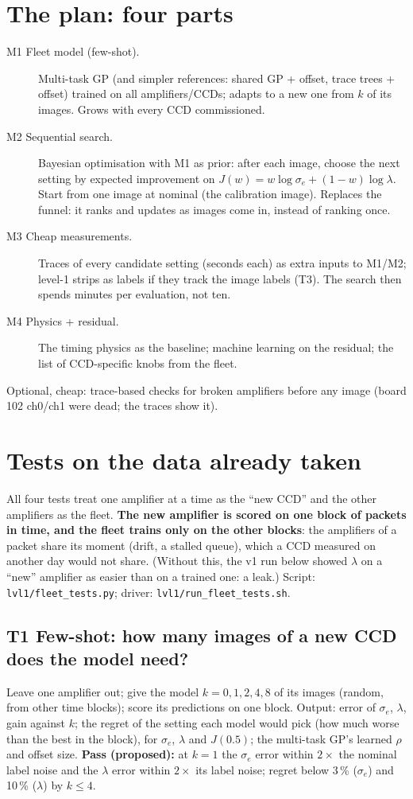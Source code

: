 \documentclass[11pt]{article}
\newcommand{\se}{\sigma_e}
\begin{document}
\section{The plan: four parts}
\begin{description}
\item[M1 Fleet model (few-shot).] Multi-task GP (and simpler references: shared GP + offset, trace trees + offset) trained
  on all amplifiers/CCDs; adapts to a new one from $k$ of its images. Grows with every CCD commissioned.
\item[M2 Sequential search.] Bayesian optimisation with M1 as prior: after each image, choose the next setting by
  expected improvement on $J(w) = w \log\se + (1-w)\log\lambda$. Start from one image at nominal (the calibration image).
  Replaces the funnel: it ranks and updates as images come in, instead of ranking once.
\item[M3 Cheap measurements.] Traces of every candidate setting (seconds each) as extra inputs to M1/M2; level-1 strips
  as labels if they track the image labels (T3). The search then spends minutes per evaluation, not ten.
\item[M4 Physics + residual.] The timing physics as the baseline; machine learning on the residual; the list of
  CCD-specific knobs from the fleet.
\end{description}
Optional, cheap: trace-based checks for broken amplifiers before any image (board 102 ch0/ch1 were dead; the traces
show it).

\section{Tests on the data already taken}\label{sec:tests}
All four tests treat one amplifier at a time as the ``new CCD'' and the other amplifiers as the fleet. \textbf{The new
amplifier is scored on one block of packets in time, and the fleet trains only on the other blocks}: the amplifiers of a
packet share its moment (drift, a stalled queue), which a CCD measured on another day would not share. (Without this,
the v1 run below showed $\lambda$ on a ``new'' amplifier as easier than on a trained one: a leak.) Script:
\texttt{lvl1/fleet\_tests.py}; driver: \texttt{lvl1/run\_fleet\_tests.sh}.

\subsection*{T1 Few-shot: how many images of a new CCD does the model need?}
Leave one amplifier out; give the model $k = 0, 1, 2, 4, 8$ of its images (random, from other time blocks); score its
predictions on one block. Output: error of $\se$, $\lambda$, gain against $k$; the regret of the setting each model would
pick (how much worse than the best in the block), for $\se$, $\lambda$ and $J(0.5)$; the multi-task GP's learned
$\rho$ and offset size. \textbf{Pass (proposed):} at $k = 1$ the $\se$ error within $2\times$ the nominal label noise and
the $\lambda$ error within $2\times$ its label noise; regret below 3\,\% ($\se$) and 10\,\% ($\lambda$) by $k \le 4$.
\end{document}
